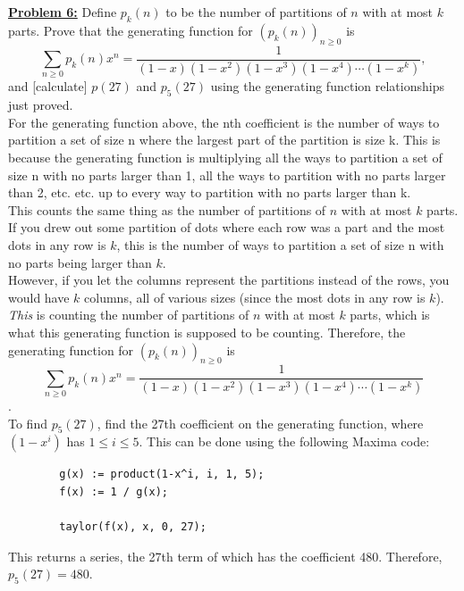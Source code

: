 \documentclass[10pt, AMS Euler]{article}
\begin{document}
	\noindent \underline{{\bf Problem 6:}} Define $p_k(n)$ to be the number of partitions of $n$ with at most $k$ parts.  
	Prove that the generating function for $\left(p_k(n)\right)_{n \geq 0}$ is 
	$$\sum_{n \geq 0} p_k(n)x^n = \frac{1}{(1-x)(1-x^2)(1-x^3)(1-x^4) \cdots (1-x^k)},$$
	and [calculate] $p(27)$ and $p_5(27)$ using the generating function relationships just proved. 
	\\

    For the generating function above, the nth coefficient is the number of ways to partition a set of size n where the largest part of the partition is size k. This is because the generating function is multiplying all the ways to partition a set of size n with no parts larger than 1, all the ways to partition with no parts larger than 2, etc. etc. up to every way to partition with no parts larger than k.\\

    This counts the same thing as the number of partitions of $n$ with at most $k$ parts. If you drew out some partition of dots where each row was a part and the most dots in any row is $k$, this is the number of ways to partition a set of size n with no parts being larger than $k$.\\

    However, if you let the columns represent the partitions instead of the rows, you would have $k$ columns, all of various sizes (since the most dots in any row is $k$). \emph{This} is counting the number of partitions of $n$ with at most $k$ parts, which is what this generating function is supposed to be counting. Therefore, the generating function for $\left(p_k(n)\right)_{n \geq 0}$ is 
	$$\sum_{n \geq 0} p_k(n)x^n = \frac{1}{(1-x)(1-x^2)(1-x^3)(1-x^4) \cdots (1-x^k)}$$.\\


    To find $p_5(27)$, find the 27th coefficient on the generating function, where $(1-x^i)$ has $1 \leq i \leq 5$. This can be done using the following Maxima code:\\

    \begin{verbatim}
        g(x) := product(1-x^i, i, 1, 5);
        f(x) := 1 / g(x);

        taylor(f(x), x, 0, 27);
    \end{verbatim}

    This returns a series, the 27th term of which has the coefficient 480. Therefore, $p_5(27) = 480$.\\
\end{document}
